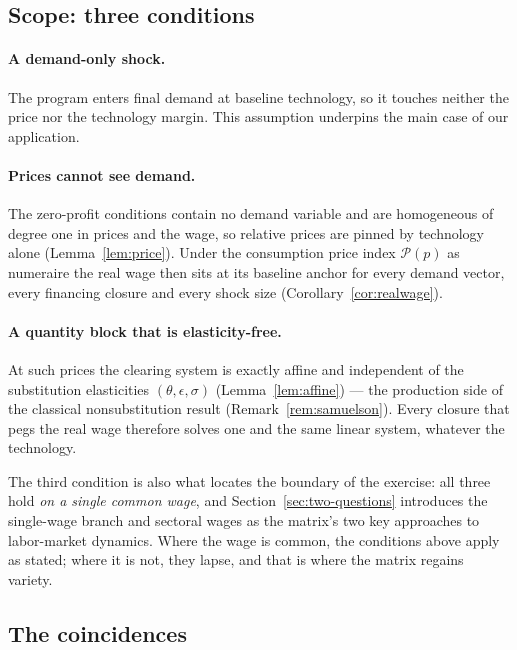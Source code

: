 \subsection*{Scope: three conditions}

\paragraph{A demand-only shock.} The program enters final demand at
baseline technology, so it touches neither the price nor the technology margin. This assumption underpins the main case of our application.

\paragraph{Prices cannot see demand.} The zero-profit conditions
contain no demand variable and are homogeneous of degree one in prices and
the wage, so relative prices are pinned by technology alone
(Lemma~\ref{lem:price}). Under the consumption price index $\mathcal{P}(p)$ as numeraire the real wage then sits at its baseline anchor for every demand vector, every financing closure and every shock size (Corollary~\ref{cor:realwage}). 

\paragraph{A quantity block that is elasticity-free.} At such prices the
clearing system is exactly affine and independent of the substitution
elasticities $(\theta,\epsilon,\sigma)$ (Lemma~\ref{lem:affine}) --- the
production side of the classical nonsubstitution result
(Remark~\ref{rem:samuelson}). Every closure that pegs the real wage therefore
solves one and the same linear system, whatever the technology.

The third condition is also what locates the boundary of the exercise: all
three hold \emph{on a single common wage}, and Section~\ref{sec:two-questions}
introduces the single-wage branch and sectoral wages as the matrix's two
key approaches to labor-market dynamics. Where the wage is common, the conditions above apply as stated; where it is not, they lapse, and that is where the matrix regains
variety.

\subsection*{The coincidences}

